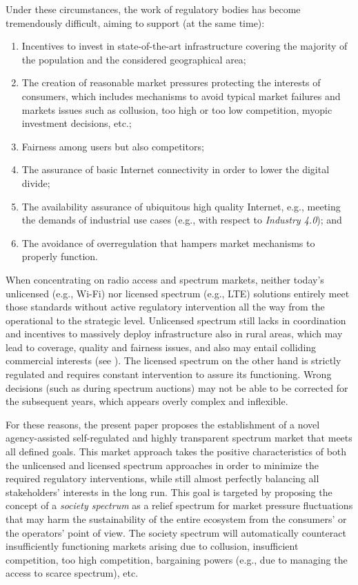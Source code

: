 \documentclass[conference]{IEEEtran}
\begin{document}
	 Under these circumstances, the work of regulatory bodies has become tremendously difficult, aiming to support (at the same time):
\begin{enumerate}
	    \item Incentives to invest in state-of-the-art infrastructure covering the majority of the population and the considered geographical area;
	    \item The creation of reasonable market pressures protecting the interests of consumers, which includes mechanisms to avoid typical market failures and markets issues such as collusion, too high or too low competition, myopic investment decisions, etc.;
	    \item Fairness among users but also competitors;
	    \item The assurance of basic Internet connectivity in order to lower the digital divide; 
	    \item The availability assurance of ubiquitous high quality Internet, e.g., meeting the demands of industrial use cases (e.g., with respect to \textit{Industry 4.0}); and
\item The avoidance of overregulation that hampers market mechanisms to properly function.
	 \end{enumerate}

When concentrating on radio access and spectrum markets, neither today's unlicensed (e.g., Wi-Fi) nor licensed spectrum (e.g., LTE) solutions entirely meet those standards without active regulatory intervention all the way from the operational to the strategic level. Unlicensed spectrum still lacks in coordination and incentives to massively deploy infrastructure also in rural areas, which may lead to coverage, quality and fairness issues, and also may entail colliding commercial interests (see \cite{zwickl2013wi}). The licensed spectrum on the other hand is strictly regulated and requires constant intervention to assure its functioning. Wrong decisions (such as during spectrum auctions) may not be able to be corrected for the subsequent years, which appears overly complex and inflexible. 

For these reasons, the present paper proposes the establishment of a novel agency-assisted self-regulated \cite{ogus1995rethinking} and highly transparent spectrum market that meets all defined goals. This market approach takes the positive characteristics of both the unlicensed and licensed spectrum approaches in order to minimize the required regulatory interventions, while still almost perfectly balancing all stakeholders' interests in the long run. This goal is targeted by proposing the concept of a  \textit{society spectrum} as a relief spectrum for market pressure fluctuations that may harm the sustainability of the entire ecosystem from the consumers' or the operators' point of view. The society spectrum will automatically counteract insufficiently functioning markets arising due to collusion, insufficient competition, too high competition, bargaining powers (e.g., due to managing the access to scarce spectrum), etc.
\end{document}
